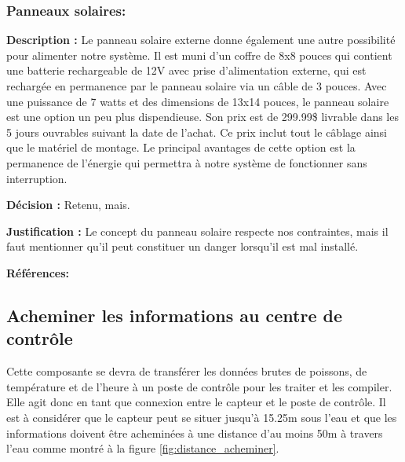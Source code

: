 \subsubsection{Panneaux solaires:}

\textbf{Description :}
Le panneau solaire externe donne également une autre possibilité pour alimenter notre système. Il est muni d'un coffre de 8x8 pouces qui contient une batterie rechargeable de 12V avec prise d'alimentation externe, qui est rechargée en permanence par le panneau solaire via un câble de 3 pouces. Avec une puissance de 7 watts et des dimensions de 13x14 pouces, le panneau solaire est une option un peu plus dispendieuse. Son prix est de 299.99\$ livrable dans les 5 jours ouvrables suivant la date de l'achat. Ce prix inclut tout le câblage ainsi que le matériel de montage. Le principal avantages de cette option est la permanence de l'énergie qui permettra à notre système de fonctionner sans interruption.

\textbf{Décision :}
Retenu, mais.

\textbf{Justification :}
Le concept du panneau solaire respecte nos contraintes, mais il faut mentionner qu'il peut constituer un danger lorsqu'il est mal installé.


\textbf{Références:} \cite{Panneau_solaire}

\begin{table}[!htb]
\footnotesize
\centering
{}
\caption{Faisabilité des concepts pour l'alimentation du système}
\label{t:Decision_alimenter}
\end{table}

\subsection{Acheminer les informations au centre de contrôle}
Cette composante se devra de transférer les données brutes de poissons, de température et de l'heure à un poste de contrôle pour les traiter et les compiler. Elle agit donc en tant que connexion entre le capteur et le poste de contrôle. Il est à considérer que le capteur peut se situer jusqu'à 15.25m sous l'eau et que les informations doivent être acheminées à une distance d'au moins 50m à travers l'eau comme montré à la figure \ref{fig:distance_acheminer}.

